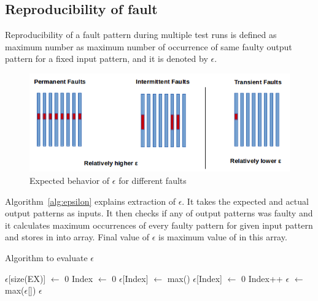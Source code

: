 \subsection{Reproducibility of fault}
Reproducibility of a fault pattern during multiple test runs is defined as maximum number as maximum number of occurrence of same faulty output pattern for a fixed input pattern, and it is denoted by $\epsilon$. 

\begin{figure}[h]
  \begin{center}
    \captionsetup{justification=centering}
    \includegraphics[scale=0.65]{figures/epsilon.png}
    \caption{Expected behavior of $\epsilon$ for different faults}
    \label{fig:epsilon}
  \end{center}
\end{figure}

Algorithm~\ref{alg:epsilon} explains extraction of $\epsilon$. It takes the expected and actual output patterns as inputs. It then checks if any of output patterns was faulty and it calculates maximum occurrences of every faulty pattern for given input pattern and stores in into array. Final value of $\epsilon$ is maximum value of in this array.

\begin{algorithm}[H]
  \caption{Algorithm to evaluate $\epsilon$}
  \label{alg:epsilon}
  \begin{algorithmic}
 \State $\epsilon$[size(EX)] $\leftarrow$ 0\;
 \State Index $\leftarrow$ 0\;
   \State $\epsilon$[Index] $\leftarrow$ max()\;
  \Else
   \State $\epsilon$[Index] $\leftarrow$ 0\;
  \EndIf
  \State Index++\;
 \EndWhile
 \State$\epsilon$ $\leftarrow$ max($\epsilon$[])\;
 \State \Return $\epsilon$\;
 \EndProcedure
 \end{algorithmic}
\end{algorithm}

